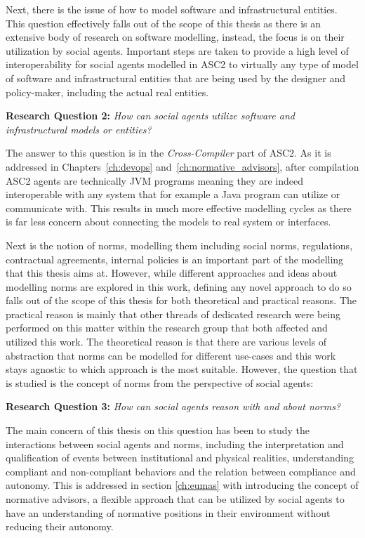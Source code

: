 Next, there is the issue of how to model software and infrastructural entities. This question effectively falls out of the scope of this thesis as there is an extensive body of research on software modelling, instead, the focus is on their utilization by social agents. Important steps are taken to provide a high level of interoperability for social agents modelled in ASC2 to virtually any type of model of software and infrastructural entities that are being used by the designer and policy-maker, including the actual real entities.

\begin{displayquote}
\textbf{Research Question 2:} \textit{How can social agents utilize software and infrastructural models or entities?}
\end{displayquote}

The answer to this question is in the \textit{Cross-Compiler} part of ASC2. As it is addressed in Chapters~\ref{ch:devops} and~\ref{ch:normative_advisors}, after compilation ASC2 agents are technically JVM programs meaning they are indeed interoperable with any system that for example a Java program can utilize or communicate with. This results in much more effective modelling cycles as there is far less concern about connecting the models to real system or interfaces.


Next is the notion of norms, modelling them including social norms, regulations, contractual agreements, internal policies is an important part of the modelling that this thesis aims at. However, while different approaches and ideas about modelling norms are explored in this work, defining any novel approach to do so falls out of the scope of this thesis for both theoretical and practical reasons. The practical reason is mainly that other threads of dedicated research were being performed on this matter within the research group that both affected and utilized this work. The theoretical reason is that there are various levels of abstraction that norms can be modelled for different use-cases and this work stays agnostic to which approach is the most suitable. However, the question that is studied is the concept of norms from the perspective of social agents:

\begin{displayquote}
\textbf{Research Question 3:} \textit{How can social agents reason with and about norms?}
\end{displayquote}

The main concern of this thesis on this question has been to study the interactions between social agents and norms, including the interpretation and qualification of events between institutional and physical realities, understanding compliant and non-compliant behaviors and the relation between compliance and autonomy. This is addressed in section \ref{ch:eumas} with introducing the concept of normative advisors, a flexible approach that can be utilized by social agents to have an understanding of normative positions in their environment without reducing their autonomy.


